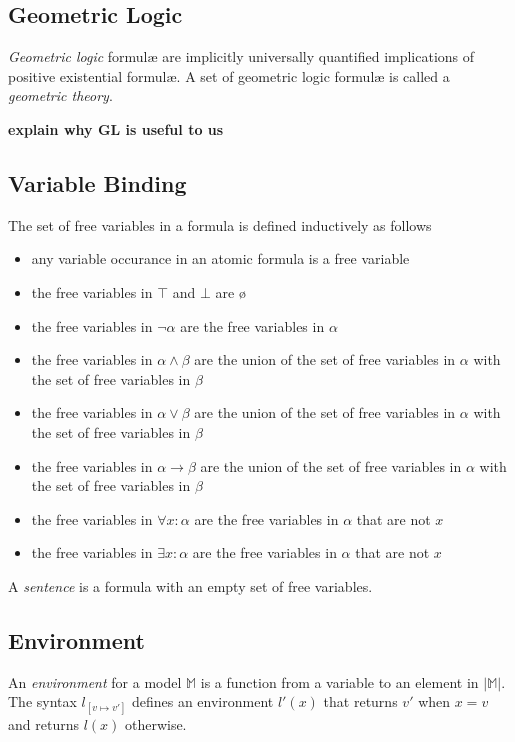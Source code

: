 	\subsection{Geometric Logic}

		\emph{Geometric logic} formul{\ae} are implicitly universally
		quantified implications of positive existential formul{\ae}. A set of
		geometric logic formul{\ae} is called a \emph{geometric theory}.

		\textbf{explain why GL is useful to us}

	\subsection{Variable Binding}

		The set of free variables in a formula is defined inductively as follows
		\begin{itemize}
		\item any variable occurance in an atomic formula is a free variable
		\item the free variables in $\top$ and $\bot$ are {\o}
		\item the free variables in $\neg\alpha$ are the free variables in $\alpha$
		\item the free variables in $\alpha \wedge \beta$ are the union of the set of free variables in $\alpha$ with the set of free variables in $\beta$
		\item the free variables in $\alpha \vee   \beta$ are the union of the set of free variables in $\alpha$ with the set of free variables in $\beta$
		\item the free variables in $\alpha \to    \beta$ are the union of the set of free variables in $\alpha$ with the set of free variables in $\beta$
		\item the free variables in $\forall x : \alpha$ are the free variables in $\alpha$ that are not $x$
		\item the free variables in $\exists x : \alpha$ are the free variables in $\alpha$ that are not $x$
		\end{itemize}
		A \emph{sentence} is a formula with an empty set of free variables.

	\subsection{Environment}

		An \emph{environment} for a model $\mathbb{M}$ is a function from a
		variable to an element in $|\mathbb{M}|$. The syntax $l_{[v \mapsto
		v']}$ defines an environment $l'(x)$ that returns $v'$ when $x=v$ and
		returns $l(x)$ otherwise.

